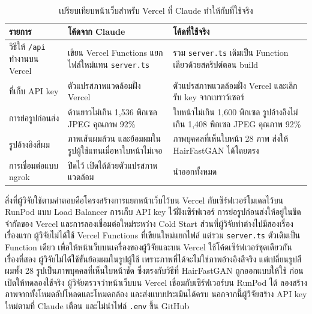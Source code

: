 \begin{table}[H]
\centering
\caption{เปรียบเทียบหน้าเว็บสำหรับ Vercel ที่ Claude ทำให้กับที่ใช้จริง}
\label{tab:ai_deploy_compare}
\small
\begin{tabular}{|L{3.4cm}|L{4.8cm}|L{4.8cm}|}
\hline
\textbf{รายการ} & \textbf{โค้ดจาก Claude} & \textbf{โค้ดที่ใช้จริง} \\ \hline
วิธีให้ \texttt{/api} ทำงานบน Vercel & เขียน Vercel Functions แยกไฟล์ใหม่แทน \texttt{server.ts} & รวม \texttt{server.ts} เดิมเป็น Function เดียวด้วยสคริปต์ตอน build \\ \hline
ที่เก็บ API key & ตัวแปรสภาพแวดล้อมฝั่ง Vercel & ตัวแปรสภาพแวดล้อมฝั่ง Vercel และเลิกรับ key จากเบราว์เซอร์ \\ \hline
การย่อรูปก่อนส่ง & ด้านยาวไม่เกิน 1,536 พิกเซล JPEG คุณภาพ 92\% & ใบหน้าไม่เกิน 1,600 พิกเซล รูปอ้างอิงไม่เกิน 1,408 พิกเซล JPEG คุณภาพ 92\% \\ \hline
รูปอ้างอิงสีผม & ภาพเส้นผมล้วน และย้อมผมในรูปผู้ใช้แทนเมื่อหาใบหน้าไม่เจอ & ภาพบุคคลที่เห็นใบหน้า 28 ภาพ ส่งให้ HairFastGAN ได้โดยตรง \\ \hline
การเชื่อมต่อแบบ ngrok & ปิดไว้ เปิดได้ด้วยตัวแปรสภาพแวดล้อม & นำออกทั้งหมด \\ \hline
\end{tabular}
\par\vspace{3pt}{\footnotesize\raggedright หมายเหตุ: API = Application Programming Interface, JPEG = Joint Photographic Experts Group (รูปแบบไฟล์ภาพ)\par}
\end{table}

สิ่งที่ผู้วิจัยใช้ตามคำตอบคือโครงสร้างการแยกหน้าเว็บไว้บน Vercel กับเซิร์ฟเวอร์โมเดลไว้บน RunPod แบบ Load Balancer
การเก็บ API key ไว้ฝั่งเซิร์ฟเวอร์ การย่อรูปก่อนส่งให้อยู่ในขีดจำกัดของ Vercel และการลองเชื่อมต่อใหม่ระหว่าง Cold Start
ส่วนที่ผู้วิจัยทำต่างไปมีสองเรื่อง
เรื่องแรก ผู้วิจัยไม่ได้ใช้ Vercel Functions ที่เขียนใหม่แยกไฟล์ แต่รวม \texttt{server.ts} ตัวเดิมเป็น Function เดียว
เพื่อให้หน้าเว็บบนเครื่องของผู้วิจัยและบน Vercel ใช้โค้ดเซิร์ฟเวอร์ชุดเดียวกัน
เรื่องที่สอง ผู้วิจัยไม่ได้ใช้ขั้นย้อมผมในรูปผู้ใช้ เพราะภาพที่ได้จะไม่ใช่ภาพอ้างอิงสีจริง
แต่เปลี่ยนรูปสีผมทั้ง 28 รูปเป็นภาพบุคคลที่เห็นใบหน้าชัด ซึ่งตรงกับวิธีที่ HairFastGAN ถูกออกแบบให้ใช้
ก่อนเปิดให้ทดลองใช้จริง ผู้วิจัยตรวจว่าหน้าเว็บบน Vercel เชื่อมกับเซิร์ฟเวอร์บน RunPod ได้
ลองสร้างภาพจากทั้งโหมดอัปโหลดและโหมดกล้อง และส่งแบบประเมินได้ครบ
นอกจากนี้ผู้วิจัยสร้าง API key ใหม่ตามที่ Claude เตือน และไม่นำไฟล์ \texttt{.env} ขึ้น GitHub

